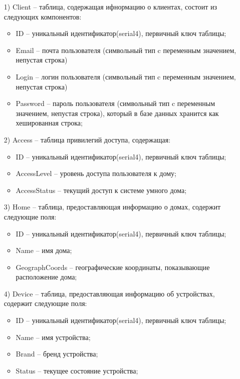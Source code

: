 \begin{enumerate}
    \item[1)]Client -- таблица, содержащая ифнормацию о клиентах, 
    состоит из следующих компонентов:
    \begin{itemize}
        \item ID -- уникальный идентификатор(serial4), первичный ключ таблицы;
        \item Email -- почта пользователя (символьный тип c переменным значением, непустая строка)
        \item Login -- логин пользователя (символьный тип c переменным значением, непустая строка)
        \item Password -- пароль пользователя (символьный тип c переменным значением, непустая строка), который 
        в базе данных хранится как хешированная строка;
    \end{itemize}
    \item[2)] Access -- таблица привилегий доступа, содержащая:
    \begin{itemize}
        \item ID -- уникальный идентификатор(serial4), первичный ключ таблицы;
        \item AccessLevel -- уровень доступа пользователя к дому;
        \item AccessStatus -- текущий доступ к системе умного дома; 
    \end{itemize}
    \item[3)] Home -- таблица, предоставляющая информацию о домах, содержит следующие поля:
    \begin{itemize}
        \item ID -- уникальный идентификатор(serial4), первичный ключ таблицы;
        \item Name -- имя дома;
        \item GeographCoords -- географические координаты, показывающие расположение дома;
    \end{itemize}
    \item[4)] Device -- таблица, предоставляющая информацию об устройствах, содержит следующие поля:
    \begin{itemize}
        \item ID -- уникальный идентификатор(serial4), первичный ключ таблицы;
        \item Name -- имя устройства;
        \item Brand -- бренд устройства;
        \item Status -- текущее состояние устройства;

\end{itemize}
\end{enumerate}

